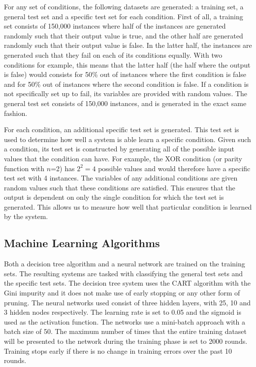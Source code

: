 \documentclass[letterpaper]{article} %
\begin{document}
For any set of conditions, the following datasets are generated: a training set, a general test set and a specific test set for each condition. First of all, a training set consists of 150,000 instances where half of the instances are generated randomly such that their output value is true, and the other half are generated randomly such that their output value is false.  In the latter half, the instances are generated such that they fail on each of its conditions equally. With two conditions for example, this means that the latter half (the half where the output is false) would consists for 50\% out of instances where the first condition is false and for 50\% out of instances where the second condition is false. If a condition is not specifically set up to fail, its variables are provided with random values. The general test set consists of 150,000 instances, and is generated in the exact same fashion.

For each condition, an additional specific test set is generated. This test set is used to determine how well a system is able learn a specific condition. Given such a condition, its test set is constructed by generating all of the possible input values that the condition can have. For example, the XOR condition (or parity function with $n$=2) has $2^2=4$ possible values and would therefore have a specific test set with 4 instances. The variables of any additional conditions are given random values such that these conditions are satisfied. This ensures that the output is dependent on only the single condition for which the test set is generated. This allows us to measure how well that particular condition is learned by the system. 



\subsection{Machine Learning Algorithms}
Both a decision tree algorithm and a neural network are trained on the training sets. The resulting systems are tasked with classifying the general test sets and the specific test sets. The decision tree system uses the CART algorithm %
with the Gini impurity and it does not make use of early stopping or any other form of pruning. The neural networks used consist of three hidden layers, with 25, 10 and 3 hidden nodes respectively. The learning rate is set to 0.05 and the sigmoid is used as the activation function. The networks use a mini-batch approach with a batch size of 50. The maximum number of times that the entire training dataset will be presented to the network during the training phase is set to 2000 rounds. Training stops early if there is no change in training errors over the past 10 rounds.
\end{document}
